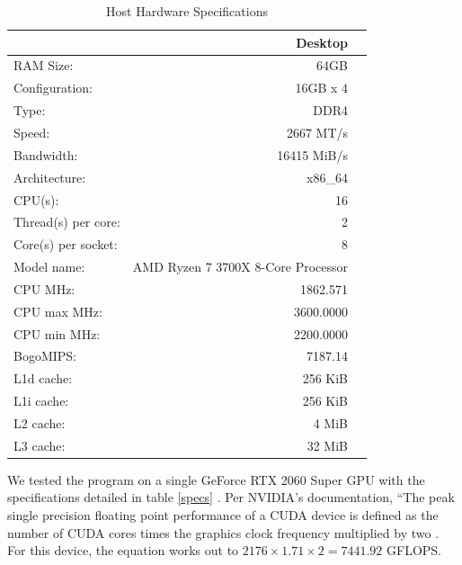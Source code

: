 \documentclass[12pt, letterpaper]{article}
\begin{document}
\begin{table}
  \centering
  \caption{Host Hardware Specifications}
  \label{hostspecs}
  \begin{tabular}{lrr}
      \toprule
          {} & Desktop \\
          \midrule
          RAM Size:            & 64GB                               \\
          Configuration:       & 16GB x 4                           \\
          Type:                & DDR4                               \\
          Speed:               & 2667 MT/s                          \\
          Bandwidth:           & 16415 MiB/s                        \\
          Architecture:        & x86\_64                            \\
          CPU(s):              & 16                                 \\
          Thread(s) per core:  & 2                                  \\
          Core(s) per socket:  & 8                                  \\
          Model name:          & AMD Ryzen 7 3700X 8-Core Processor \\
          CPU MHz:             & 1862.571                           \\
          CPU max MHz:         & 3600.0000                          \\
          CPU min MHz:         & 2200.0000                          \\
          BogoMIPS:            & 7187.14                            \\
          L1d cache:           & 256 KiB                            \\
          L1i cache:           & 256 KiB                            \\
          L2 cache:            & 4 MiB                              \\
          L3 cache:            & 32 MiB                             \\
          \bottomrule
  \end{tabular}
\end{table}

We tested the program on a single GeForce RTX 2060 Super GPU with the
specifications detailed in table \ref{specs} \cite{techpowerup}. Per NVIDIA's
documentation, ``The peak single precision floating point performance of a CUDA
device is defined as the number of CUDA cores times the graphics clock frequency
multiplied by two \cite{nvidia_flops}. For this device, the equation works out
to $2176 \times 1.71 \times 2 = 7441.92$ GFLOPS.
\end{document}

